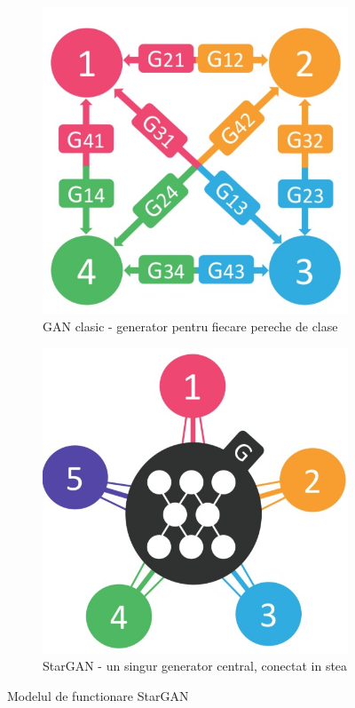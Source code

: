 \documentclass[12pt]{article}
\theoremstyle{definition}
\begin{document}
\begin{figure}[H]
  \centering

	\begin{subfigure}{0.4\textwidth}
	    \centering
		\includegraphics[width=\linewidth]{stargan.jpg}
		\caption{GAN clasic - generator pentru fiecare pereche de clase}
	\end{subfigure}
	\vspace{1em}
	\begin{subfigure}{0.4\textwidth}
		\centering
		\includegraphics[width=\linewidth]{stargan1.jpg}
		\caption{StarGAN - un singur generator central, conectat in stea}
	\end{subfigure}

  \caption{Modelul de functionare StarGAN}
  \label{fig:architecture}
\end{figure}
\end{document}
